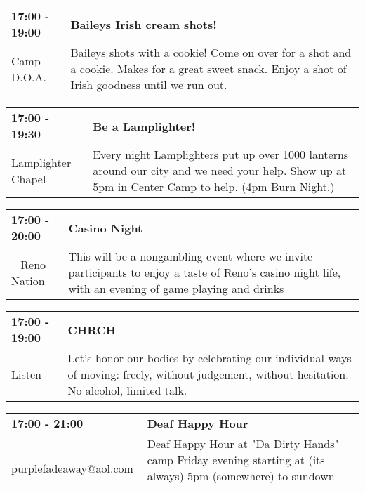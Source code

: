 \begin{tabular}{ p{1in} p{2.2in} }
    \textbf{17:00 - 19:00} & \textbf{Baileys Irish cream shots!} \\
    Camp D.O.A. \newline  & Baileys shots with a cookie! Come on over for a shot and a cookie. Makes for a great sweet snack. Enjoy a shot of Irish goodness until we run out. \\
    \hline 
\end{tabular}
    
\begin{tabular}{ p{1in} p{2.2in} }
    \textbf{17:00 - 19:30} & \textbf{Be a Lamplighter!} \\
    Lamplighter Chapel \newline  & Every night Lamplighters put up over 1000 lanterns around our city and we need your help. Show up at 5pm in Center Camp to help. (4pm Burn Night.) \\
    \hline 
\end{tabular}
    
\begin{tabular}{ p{1in} p{2.2in} }
    \textbf{17:00 - 20:00} & \textbf{Casino Night} \\
    ~ \newline Reno Nation & This will be a nongambling event where we invite participants to enjoy a taste of Reno's casino night life, with an evening of game playing and drinks \\
    \hline 
\end{tabular}
    
\begin{tabular}{ p{1in} p{2.2in} }
    \textbf{17:00 - 19:00} & \textbf{CHRCH} \\
    Listen \newline  & Let's honor our bodies by celebrating our individual ways of moving: freely, without judgement, without hesitation. No alcohol, limited talk. \\
    \hline 
\end{tabular}
    
\begin{tabular}{ p{1in} p{2.2in} }
    \textbf{17:00 - 21:00} & \textbf{Deaf Happy Hour} \\
    ~ \newline purplefadeaway@aol.com & Deaf Happy Hour at "Da Dirty Hands" camp Friday evening starting at (its always) 5pm (somewhere) to sundown \\
    \hline 
\end{tabular}
    
